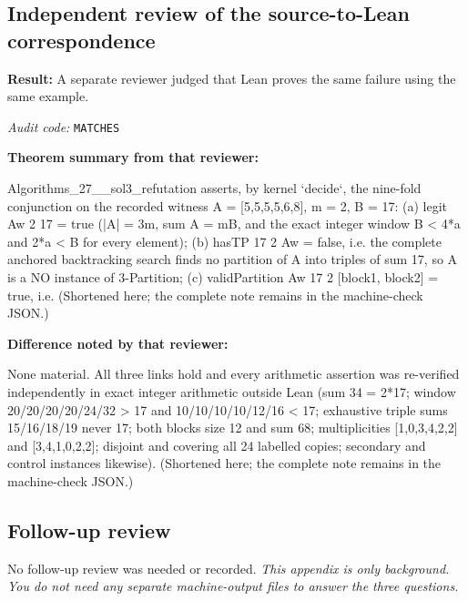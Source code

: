 \documentclass[11pt]{article}
\begin{document}
\subsection*{Independent review of the source-to-Lean correspondence}
\textbf{Result:} A separate reviewer judged that Lean proves the same failure using the same example.
\par\textit{Audit code:} \nolinkurl{MATCHES}
\par\textbf{Theorem summary from that reviewer:}
\begin{Vsrc}
Algorithms_27__sol3_refutation asserts, by kernel `decide`, the nine-fold conjunction on the recorded witness A = [5,5,5,5,6,8], m = 2, B = 17: (a) legit Aw 2 17 = true (|A| = 3m, sum A = mB, and the exact integer window B < 4*a and 2*a < B for every element); (b) hasTP 17 2 Aw = false, i.e. the complete anchored backtracking search finds no partition of A into triples of sum 17, so A is a NO instance of 3-Partition; (c) validPartition Aw 17 2 [block1, block2] = true, i.e. (Shortened here; the complete note remains in the machine-check JSON.)
\end{Vsrc}
\par\textbf{Difference noted by that reviewer:}
\begin{Vsrc}
None material. All three links hold and every arithmetic assertion was re-verified independently in exact integer arithmetic outside Lean (sum 34 = 2*17; window 20/20/20/20/24/32 > 17 and 10/10/10/10/12/16 < 17; exhaustive triple sums 15/16/18/19 never 17; both blocks size 12 and sum 68; multiplicities [1,0,3,4,2,2] and [3,4,1,0,2,2]; disjoint and covering all 24 labelled copies; secondary and control instances likewise). (Shortened here; the complete note remains in the machine-check JSON.)
\end{Vsrc}
\subsection*{Follow-up review}
No follow-up review was needed or recorded.
\textit{This appendix is only background. You do not need any separate machine-output files to answer the three questions.}
\end{document}
